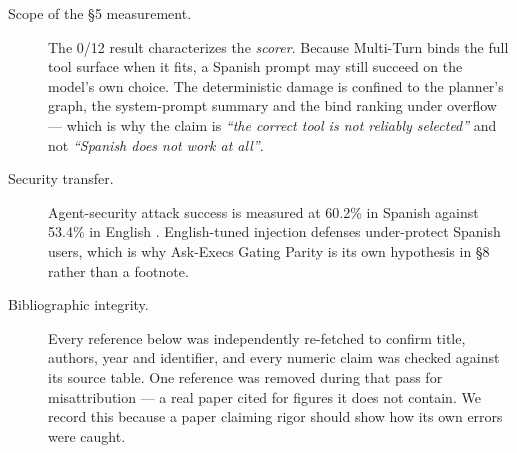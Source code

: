 \begin{description}
\item[Scope of the \S5 measurement.] The 0/12 result characterizes the \emph{scorer}.
Because Multi-Turn binds the full tool surface when it fits, a Spanish prompt may still
succeed on the model's own choice. The deterministic damage is confined to the planner's
graph, the system-prompt summary and the bind ranking under overflow --- which is why
the claim is \emph{``the correct tool is not reliably selected''} and not \emph{``Spanish
does not work at all''}.

\item[Security transfer.] Agent-security attack success is measured at 60.2\% in Spanish
against 53.4\% in English \citep{hofman2025maps}. English-tuned injection defenses
under-protect Spanish users, which is why Ask-Execs Gating Parity is its own hypothesis
in \S8 rather than a footnote.

\item[Bibliographic integrity.] Every reference below was independently re-fetched to
confirm title, authors, year and identifier, and every numeric claim was checked against
its source table. One reference was removed during that pass for misattribution --- a
real paper cited for figures it does not contain. We record this because a paper claiming
rigor should show how its own errors were caught.

\end{description}
